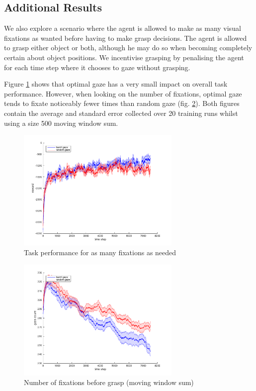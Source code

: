 \documentclass[11]{article}
\begin{document}
\subsection{Additional Results}
We also explore a scenario where the agent is allowed to make as many visual fixations as wanted before having to make grasp decisions. The agent is allowed to grasp either object or both, although he may do so when becoming completely certain about object positions. We incentivise grasping by penalising the agent for each time step where it chooses to gaze without grasping.

Figure \ref{fig:resultsTimless} shows that optimal gaze has a very small impact on overall task performance. However, when looking on the number of fixations, optimal gaze tends to fixate noticeably fewer times than random gaze (fig. \ref{fig:gazeCount}). Both figures contain the average and standard error collected over 20 training runs whilst using a size 500 moving window sum.

\begin{figure}[h]
	\centering
	\includegraphics[width=0.7\textwidth]{figures/resultsTimeless.png}
	\caption{Task performance for as many fixations as needed}
	\label{fig:resultsTimless}
\end{figure}


\begin{figure}[!h]
	\centering
	\includegraphics[width=0.7\textwidth]{figures/gazeCount.png}
	\caption{Number of fixations before grasp (moving window sum)}
	\label{fig:gazeCount}
\end{figure}
\end{document}
